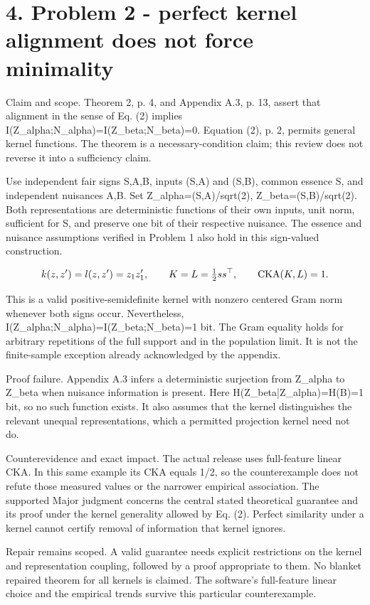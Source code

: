 \documentclass[10pt]{article}
\begin{document}
\section*{4. Problem 2 - perfect kernel alignment does not force minimality}
Claim and scope. Theorem 2, p. 4, and Appendix A.3, p. 13, assert that alignment in the sense of Eq. (2) implies I(Z\_alpha;N\_alpha)=I(Z\_beta;N\_beta)=0. Equation (2), p. 2, permits general kernel functions. The theorem is a necessary-condition claim; this review does not reverse it into a sufficiency claim.\par
Use independent fair signs S,A,B, inputs (S,A) and (S,B), common essence S, and independent nuisances A,B. Set Z\_alpha=(S,A)/sqrt(2), Z\_beta=(S,B)/sqrt(2). Both representations are deterministic functions of their own inputs, unit norm, sufficient for S, and preserve one bit of their respective nuisance. The essence and nuisance assumptions verified in Problem 1 also hold in this sign-valued construction.\par
\[k(z,z')=l(z,z')=z_1z'_1,\qquad K=L=\tfrac12 ss^\top,\qquad {\rm CKA}(K,L)=1.\]\par
This is a valid positive-semidefinite kernel with nonzero centered Gram norm whenever both signs occur. Nevertheless, I(Z\_alpha;N\_alpha)=I(Z\_beta;N\_beta)=1 bit. The Gram equality holds for arbitrary repetitions of the full support and in the population limit. It is not the finite-sample exception already acknowledged by the appendix.\par
Proof failure. Appendix A.3 infers a deterministic surjection from Z\_alpha to Z\_beta when nuisance information is present. Here H(Z\_beta|Z\_alpha)=H(B)=1 bit, so no such function exists. It also assumes that the kernel distinguishes the relevant unequal representations, which a permitted projection kernel need not do.\par
Counterevidence and exact impact. The actual release uses full-feature linear CKA. In this same example its CKA equals 1/2, so the counterexample does not refute those measured values or the narrower empirical association. The supported Major judgment concerns the central stated theoretical guarantee and its proof under the kernel generality allowed by Eq. (2). Perfect similarity under a kernel cannot certify removal of information that kernel ignores.\par
Repair remains scoped. A valid guarantee needs explicit restrictions on the kernel and representation coupling, followed by a proof appropriate to them. No blanket repaired theorem for all kernels is claimed. The software’s full-feature linear choice and the empirical trends survive this particular counterexample.\par
\end{document}
